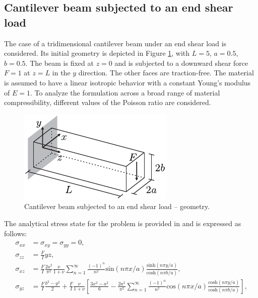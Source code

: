\documentclass[english,11pt,3p,number,sort&compress]{elsarticle}
\begin{document}
\subsection{Cantilever beam subjected to an end shear load \label{subsec:bishop}}

The case of a tridimensional cantilever beam under an end shear load is considered. Its initial geometry is depicted in Figure \ref{fig:bishop-beam-geometry}, with $L=5$, $a=0.5$, $b=0.5$. The beam is fixed at $z=0$ and is subjected to a downward shear force $F=1$ at $z=L$ in the $y$ direction. The other faces are traction-free. The material is assumed to have a linear isotropic behavior with a constant Young's modulus of $E=1$. To analyze the formulation across a broad range of material compressibility, different values of the Poisson ratio are considered.

\begin{figure}[H]
	\centering
	\includegraphics[scale=1.0]{bishop-beam-geometry}
	\caption{Cantilever beam subjected to an end shear load -- geometry.}
	\label{fig:bishop-beam-geometry}
\end{figure}

The analytical stress state for the problem is provided in \cite{bishop2014displacement} and is expressed as follows:
\begin{equation} \label{eq:bishop-stress}
	\begin{aligned}
		\sigma_{xx} &= \sigma_{xy} = \sigma_{yy} = 0 \text{,}\\
		\sigma_{zz} &= \frac{F}{I} yz \text{,}\\
		\sigma_{xz} &= \frac{F}{I} \frac{2a^2}{\pi^2}\frac{\nu}{1+\nu} \sum_{n=1}^{\infty} \frac{(-1)^n}{n^2} \text{sin}\left(n\pi x/a\right) \frac{\text{sinh}\left( n\pi y/a \right)}{\text{cosh}\left( n\pi b/a \right)} \text{,}\\
		\sigma_{yz} &= \frac{F}{I} \frac{b^2-y^2}{2} + \frac{F}{I}\frac{\nu}{1+\nu} \left[ \frac{3x^2-a^2}{6} - \frac{2a^2}{\pi^2} \sum_{n=1}^{\infty} \frac{(-1)^n}{n^2} \text{cos}\left(n\pi x/a\right) \frac{\text{cosh}\left( n\pi y/a \right)}{\text{cosh}\left( n\pi b/a \right)}  \right]\text{,}\\
	\end{aligned}
\end{equation}
\end{document}
